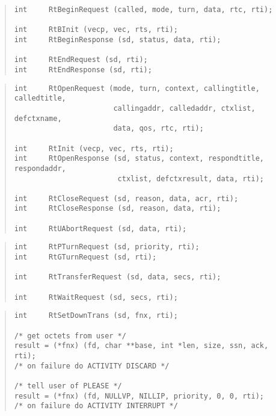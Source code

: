 \begin{bwslide}

\begin{quote}\small\begin{verbatim}
int     RtBeginRequest (called, mode, turn, data, rtc, rti);

int     RtBInit (vecp, vec, rts, rti);
int     RtBeginResponse (sd, status, data, rti);

int     RtEndRequest (sd, rti);
int     RtEndResponse (sd, rti);
\end{verbatim}\end{quote}
\end{bwslide}


\begin{bwslide}

\begin{quote}\small\begin{verbatim}
int     RtOpenRequest (mode, turn, context, callingtitle, calledtitle,
                       callingaddr, calledaddr, ctxlist, defctxname,
                       data, qos, rtc, rti);

int     RtInit (vecp, vec, rts, rti);
int     RtOpenResponse (sd, status, context, respondtitle, respondaddr,
                        ctxlist, defctxresult, data, rti);

int     RtCloseRequest (sd, reason, data, acr, rti);
int     RtCloseResponse (sd, reason, data, rti);

int     RtUAbortRequest (sd, data, rti);
\end{verbatim}\end{quote}
\end{bwslide}


\begin{bwslide}

\begin{quote}\small\begin{verbatim}
int     RtPTurnRequest (sd, priority, rti);
int     RtGTurnRequest (sd, rti);

int     RtTransferRequest (sd, data, secs, rti);

int     RtWaitRequest (sd, secs, rti);
\end{verbatim}\end{quote}
\end{bwslide}


\begin{bwslide}

\begin{quote}\small\begin{verbatim}
int     RtSetDownTrans (sd, fnx, rti);

/* get octets from user */
result = (*fnx) (fd, char **base, int *len, size, ssn, ack, rti);
/* on failure do ACTIVITY DISCARD */

/* tell user of PLEASE */
result = (*fnx) (fd, NULLVP, NILLIP, priority, 0, 0, rti);
/* on failure do ACTIVITY INTERRUPT */
\end{verbatim}\end{quote}
\end{bwslide}



